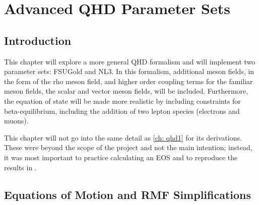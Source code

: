 \newcommand{\B}{{\boldsymbol b}}

\chapter{Advanced QHD Parameter Sets}\label{ch: advanced}

\section{Introduction}

This chapter will explore a more general QHD formalism and will implement two parameter sets: FSUGold and NL3. In this formalism, additional meson fields, in the form of the rho meson field, and higher order coupling terms for the familiar meson fields, the scalar and vector meson fields, will be included. Furthermore, the equation of state will be made more realistic by including constraints for beta-equilibrium, including the addition of two lepton species (electrons and muons).

This chapter will not go into the same detail as \autoref{ch: qhd1} for its derivations. These were beyond the scope of the project and not the main intention; instead, it was most important to practice calculating an EOS and to reproduce the results in \autocite{diener_2008}.



\section{Equations of Motion and RMF Simplifications}\label{sec: adv, eom}

